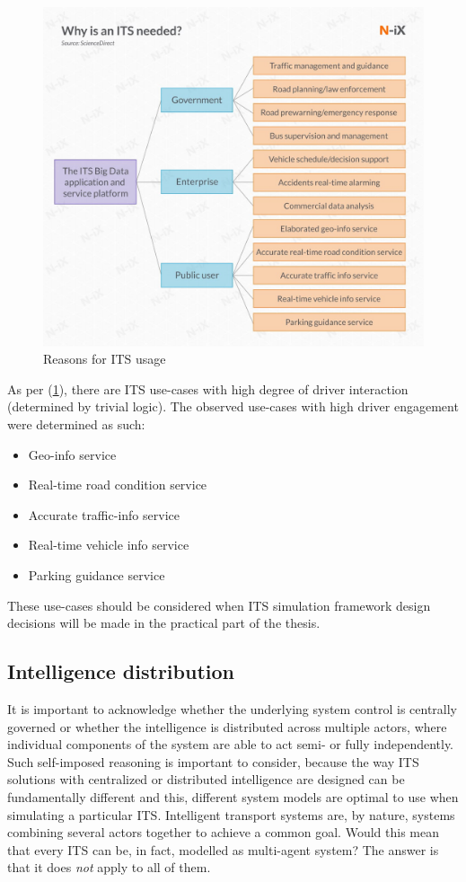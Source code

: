 \documentclass[main.tex]{subfiles}
\begin{document}
\begin{figure}[htbp]
    \centering
    \includegraphics[width=.8\textwidth]{why is ITS needed.jpg}
    \caption{Reasons for ITS usage \cite{Lishchenko2021}}
    \label{whyITS}
\end{figure}

As per (\ref{whyITS}), there are ITS use-cases with high degree of driver interaction (determined 
by trivial logic). The observed use-cases with high driver engagement were determined as such:

\begin{itemize}
    \item Geo-info service
    \item Real-time road condition service 
    \item Accurate traffic-info service 
    \item Real-time vehicle info service 
    \item Parking guidance service
\end{itemize}

These use-cases should be considered when ITS simulation framework design decisions will be made in the practical part of the 
thesis.

\subsection{Intelligence distribution} \label{mas-compatibility}

It is important to acknowledge whether the underlying system control is centrally governed 
or whether the intelligence is distributed across multiple actors, where individual 
components of the system are able to act semi- or fully independently.
Such self-imposed reasoning is important to consider, because the way ITS solutions 
with centralized or distributed intelligence are designed can be fundamentally different 
and this, different system models are optimal to use when simulating a particular ITS. 
Intelligent transport systems are, by nature, systems combining several actors together to
achieve a common goal.  Would this mean that every ITS can be, in fact, modelled as multi-agent
system? The answer is that it does \emph{not} apply to all of them. 
\end{document}
